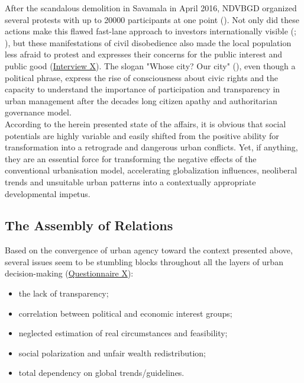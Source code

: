 \documentclass[11pt]{report}
\begin{document}
After the scandalous demolition in Savamala in April 2016, NDVBGD organized several protests with up to 20000 participants at one point (\cite{BalkanInsight2016}).
Not only did these actions make this flawed fast-lane approach to investors internationally visible (\href{ref}{\citealt{eror_belgrades_2015}}; \href{ref}{\citealt{wright_belgrade_2015}}), but these manifestations of civil disobedience also made the local population less afraid to protest and expresses their concerns for the public interest and public good
(\href{InterviewX}{Interview X}).
The slogan "Whose city? Our city" (\href{ref}{\citealt{tulimirovic_protest_2016}}), even though a political phrase, express the rise of consciousness about civic rights and the capacity to understand the importance of participation and transparency in urban management after the decades long citizen apathy and authoritarian governance model.
\\

According to the herein presented state of the affairs, it is obvious that social potentials are highly variable and easily shifted from the positive ability for transformation into a retrograde and dangerous urban conflicts. Yet, if anything, they are an essential force for transforming the negative effects of the conventional urbanisation model, accelerating globalization influences, neoliberal trends and unsuitable urban patterns into a contextually appropriate developmental  impetus. 

\subsection{The Assembly of Relations}

Based on the convergence of urban agency toward  the context presented above, several issues seem to be stumbling blocks throughout all the layers of urban decision-making
(\href{Questionnaire Experts Post-socialist}{Questionnaire X}):

\begin{itemize}
\item the lack of transparency;
\item correlation between political and economic interest groups;
\item neglected estimation of real circumstances and feasibility;
\item social polarization and unfair wealth redistribution;
\item total dependency on global trends/guidelines.
\end{itemize}
\end{document}
